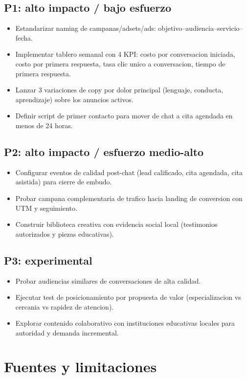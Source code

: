 \documentclass[9pt,a4paper,twocolumn,twoside]{tau-class/tau}
\begin{document}
\subsection{P1: alto impacto / bajo esfuerzo}
\begin{itemize}
  \item Estandarizar naming de campanas/adsets/ads: objetivo--audiencia--servicio--fecha.
  \item Implementar tablero semanal con 4 KPI: costo por conversacion iniciada, costo por primera respuesta, tasa clic unico a conversacion, tiempo de primera respuesta.
  \item Lanzar 3 variaciones de copy por dolor principal (lenguaje, conducta, aprendizaje) sobre los anuncios activos.
  \item Definir script de primer contacto para mover de chat a cita agendada en menos de 24 horas.
\end{itemize}

\subsection{P2: alto impacto / esfuerzo medio-alto}
\begin{itemize}
  \item Configurar eventos de calidad post-chat (lead calificado, cita agendada, cita asistida) para cierre de embudo.
  \item Probar campana complementaria de trafico hacia landing de conversion con UTM y seguimiento.
  \item Construir biblioteca creativa con evidencia social local (testimonios autorizados y piezas educativas).
\end{itemize}

\subsection{P3: experimental}
\begin{itemize}
  \item Probar audiencias similares de conversaciones de alta calidad.
  \item Ejecutar test de posicionamiento por propuesta de valor (especializacion vs cercania vs rapidez de atencion).
  \item Explorar contenido colaborativo con instituciones educativas locales para autoridad y demanda incremental.
\end{itemize}

\section{Fuentes y limitaciones}
\end{document}
